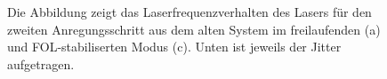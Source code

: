 \begin{figure}[hp]
 	\centering
 	\footnotesize
 	\fbox{\parbox{\dimexpr \linewidth - 2\fboxrule - 2\fboxsep}{
 	\subfloat[]{
		\label{subfig:laserstabilitaet_alt_freilaufend}
		
		}\\
	 \subfloat[]{
		\label{subfig:laserstabilitaet_alt_FOL}
		
		}
	}}
	\caption[Laserfrequenzverhalten \textit{TA-Pro}]{Die Abbildung zeigt das
	Laserfrequenzverhalten des Lasers für den zweiten Anregungsschritt aus dem
	alten System im freilaufenden (a) und FOL-stabiliserten Modus (c). Unten ist
	jeweils der Jitter aufgetragen.}
	\label{fig:laserstabilitaet_c}
\end{figure}
